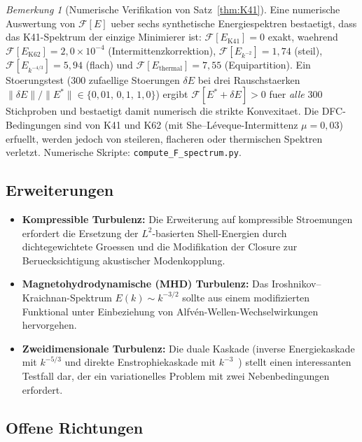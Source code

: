\documentclass[12pt,a4paper]{article}
\theoremstyle{definition}
\theoremstyle{plain}
\theoremstyle{remark}
\newtheorem{remark}[definition]{Bemerkung}
\begin{document}
\begin{remark}[Numerische Verifikation von Satz~\ref{thm:K41}]\label{rem:numerical-F}
Eine numerische Auswertung von $\mathcal{F}[E]$ ueber sechs synthetische Energiespektren bestaetigt, dass das K41-Spektrum der einzige Minimierer ist: $\mathcal{F}[E_{\mathrm{K41}}] = 0$ exakt, waehrend $\mathcal{F}[E_{\mathrm{K62}}] = 2{,}0 \times 10^{-4}$ (Intermittenzkorrektion), $\mathcal{F}[E_{k^{-2}}] = 1{,}74$ (steil), $\mathcal{F}[E_{k^{-4/3}}] = 5{,}94$ (flach) und $\mathcal{F}[E_{\mathrm{thermal}}] = 7{,}55$ (Equipartition). Ein Stoerungstest ($300$ zufaellige Stoerungen $\delta E$ bei drei Rauschstaerken $\|\delta E\|/\|E^*\| \in \{0{,}01,\, 0{,}1,\, 1{,}0\}$) ergibt $\mathcal{F}[E^* + \delta E] > 0$ fuer \emph{alle} $300$ Stichproben und bestaetigt damit numerisch die strikte Konvexitaet. Die DFC-Bedingungen sind von K41 und K62 (mit She--L\'eveque-Intermittenz $\mu = 0{,}03$) erfuellt, werden jedoch von steileren, flacheren oder thermischen Spektren verletzt. Numerische Skripte: \texttt{compute\_F\_spectrum.py}.
\end{remark}

\subsection{Erweiterungen}

\begin{itemize}
  \item \textbf{Kompressible Turbulenz:}
    Die Erweiterung auf kompressible Stroemungen erfordert die Ersetzung
    der $L^2$-basierten Shell-Energien durch dichtegewichtete Groessen
    und die Modifikation der Closure zur Beruecksichtigung akustischer
    Modenkopplung.
  \item \textbf{Magnetohydrodynamische (MHD) Turbulenz:}
    Das Iroshnikov--Kraichnan-Spektrum $E(k) \sim k^{-3/2}$ sollte aus
    einem modifizierten Funktional unter Einbeziehung von
    Alfv\'en-Wellen-Wechselwirkungen hervorgehen.
  \item \textbf{Zweidimensionale Turbulenz:}
    Die duale Kaskade (inverse Energiekaskade mit $k^{-5/3}$ und direkte
    Enstrophiekaskade mit $k^{-3}$~\cite{Kraichnan67}) stellt einen
    interessanten Testfall dar, der ein variationelles Problem mit zwei
    Nebenbedingungen erfordert.
\end{itemize}

\subsection{Offene Richtungen}
\end{document}
